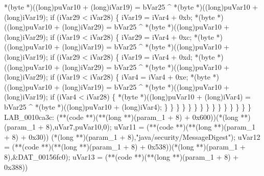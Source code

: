 \documentclass[
]{article}
\newenvironment{Shaded}{}{}
\newcommand{\NormalTok}[1]{#1}
\begin{document}
\begin{Shaded}
\begin{Highlighting}[]
\NormalTok{                      *(byte *)((long)puVar10 + (long)iVar19) =}
\NormalTok{                           bVar25 \^{} *(byte *)((long)puVar10 + (long)iVar19);}
\NormalTok{                      if (iVar29 \textless{} iVar28) \{}
\NormalTok{                        iVar19 = iVar4 + 0xb;}
\NormalTok{                        *(byte *)((long)puVar10 + (long)iVar29) =}
\NormalTok{                             bVar25 \^{} *(byte *)((long)puVar10 + (long)iVar29);}
\NormalTok{                        if (iVar19 \textless{} iVar28) \{}
\NormalTok{                          iVar29 = iVar4 + 0xc;}
\NormalTok{                          *(byte *)((long)puVar10 + (long)iVar19) =}
\NormalTok{                               bVar25 \^{} *(byte *)((long)puVar10 + (long)iVar19);}
\NormalTok{                          if (iVar29 \textless{} iVar28) \{}
\NormalTok{                            iVar19 = iVar4 + 0xd;}
\NormalTok{                            *(byte *)((long)puVar10 + (long)iVar29) =}
\NormalTok{                                 bVar25 \^{} *(byte *)((long)puVar10 + (long)iVar29);}
\NormalTok{                            if (iVar19 \textless{} iVar28) \{}
\NormalTok{                              iVar4 = iVar4 + 0xe;}
\NormalTok{                              *(byte *)((long)puVar10 + (long)iVar19) =}
\NormalTok{                                   bVar25 \^{} *(byte *)((long)puVar10 + (long)iVar19);}
\NormalTok{                              if (iVar4 \textless{} iVar28) \{}
\NormalTok{                                *(byte *)((long)puVar10 + (long)iVar4) =}
\NormalTok{                                     bVar25 \^{} *(byte *)((long)puVar10 + (long)iVar4);}
\NormalTok{                              \}}
\NormalTok{                            \}}
\NormalTok{                          \}}
\NormalTok{                        \}}
\NormalTok{                      \}}
\NormalTok{                    \}}
\NormalTok{                  \}}
\NormalTok{                \}}
\NormalTok{              \}}
\NormalTok{            \}}
\NormalTok{          \}}
\NormalTok{        \}}
\NormalTok{      \}}
\NormalTok{    \}}
\NormalTok{  \}}
\NormalTok{LAB\_0010ca3c:}
\NormalTok{  (**(code **)(**(long **)(param\_1 + 8) + 0x600))(*(long **)(param\_1 + 8),uVar7,puVar10,0);}
\NormalTok{  uVar11 = (**(code **)(**(long **)(param\_1 + 8) + 0x30))}
\NormalTok{                     (*(long **)(param\_1 + 8),"java/security/MessageDigest");}
\NormalTok{  uVar12 = (**(code **)(**(long **)(param\_1 + 8) + 0x538))(*(long **)(param\_1 + 8),\&DAT\_00156fc0);}
\NormalTok{  uVar13 = (**(code **)(**(long **)(param\_1 + 8) + 0x388))}

\end{Highlighting}
\end{Shaded}
\end{document}
